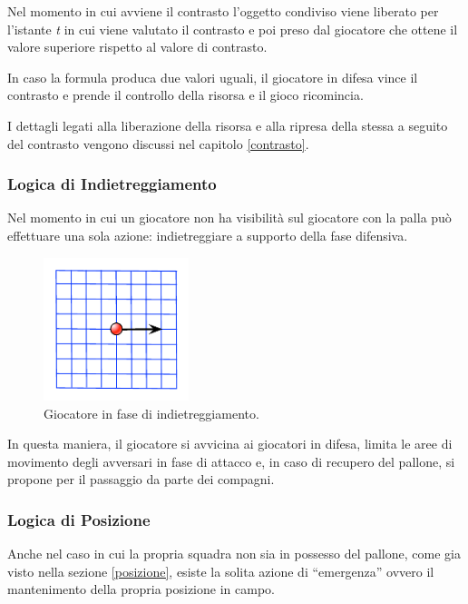 \documentclass[aps,letterpaper,10pt]{article}
\begin{document}
Nel momento in cui avviene il contrasto l'oggetto condiviso viene liberato per l'istante \emph{t} in cui viene valutato
il contrasto e poi preso dal giocatore che ottene il valore superiore rispetto al valore di contrasto. \vspace{3mm}

In caso la formula produca due valori uguali, il giocatore in difesa vince il contrasto e prende il controllo della
risorsa e il gioco ricomincia. \vspace{3mm}

I dettagli legati alla liberazione della risorsa e alla ripresa della stessa a seguito del contrasto vengono discussi
nel capitolo \ref{contrasto}.

\subsubsection{Logica di Indietreggiamento}

Nel momento in cui un giocatore non ha visibilit\`a sul giocatore con la palla pu\`o effettuare una sola azione:
indietreggiare a supporto della fase difensiva.

\begin{figure}[H]
	\begin{center}
		\includegraphics[width=160px]{images/return.pdf}
	\end{center}
\caption{Giocatore in fase di indietreggiamento.}
\end{figure}

In questa maniera, il giocatore si avvicina ai giocatori in difesa, limita le aree di movimento degli avversari in fase
di attacco e, in caso di recupero del pallone, si propone per il passaggio da parte dei compagni.

\subsubsection{Logica di Posizione}

Anche nel caso in cui la propria squadra non sia in possesso del pallone, come gia visto nella sezione \ref{posizione},
esiste la solita azione di ``emergenza'' ovvero il mantenimento della propria posizione in campo.
\end{document}
